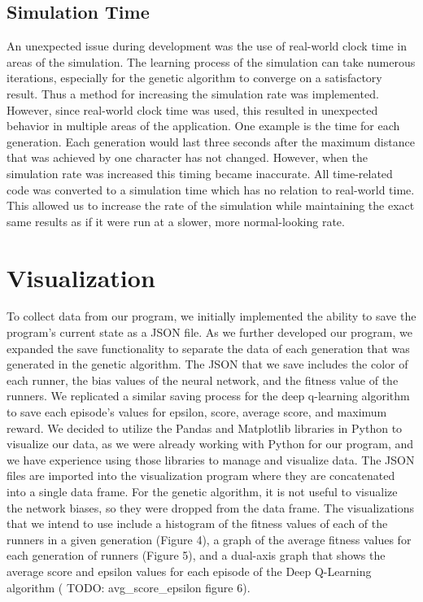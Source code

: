 \documentclass[letterpaper]{article} %
\begin{document}
\subsection{Simulation Time}

\par An unexpected issue during development was the use of real-world clock time in areas of the simulation. The learning process of the simulation can take numerous iterations, especially for the genetic algorithm to converge on a satisfactory result. Thus a method for increasing the simulation rate was implemented. However, since real-world clock time was used, this resulted in unexpected behavior in multiple areas of the application. One example is the time for each generation. Each generation would last three seconds after the maximum distance that was achieved by one character has not changed. However, when the simulation rate was increased this timing became inaccurate. All time-related code was converted to a simulation time which has no relation to real-world time. This allowed us to increase the rate of the simulation while maintaining the exact same results as if it were run at a slower, more normal-looking rate.

\section{Visualization}

\par To collect data from our program, we initially implemented the ability to save the program's current state as a JSON file. As we further developed our program, we expanded the save functionality to separate the data of each generation that was generated in the genetic algorithm. The JSON that we save includes the color of each runner, the bias values of the neural network, and the fitness value of the runners. We replicated a similar saving process for the deep q-learning algorithm to save each episode's values for epsilon, score, average score, and maximum reward. We decided to utilize the Pandas and Matplotlib libraries in Python to visualize our data, as we were already working with Python for our program, and we have experience using those libraries to manage and visualize data. The JSON files are imported into the visualization program where they are concatenated into a single data frame. For the genetic algorithm, it is not useful to visualize the network biases, so they were dropped from the data frame. The visualizations that we intend to use include a histogram of the fitness values of each of the runners in a given generation (Figure 4), a graph of the average fitness values for each generation of runners (Figure 5), and a dual-axis graph that shows the average score and epsilon values for each episode of the Deep Q-Learning algorithm ( TODO: avg\_score\_epsilon figure 6).
\end{document}
